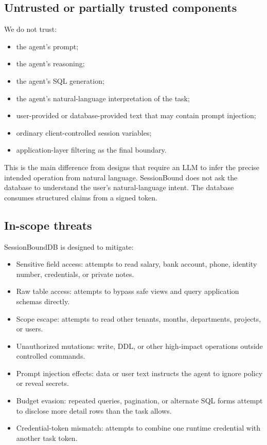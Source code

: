 \documentclass[journal]{IEEEtran}
\providecommand{\tightlist}{%
  \setlength{\itemsep}{0pt}\setlength{\parskip}{0pt}}
\begin{document}
\hypertarget{untrusted-or-partially-trusted-components}{%
\subsection{Untrusted or partially trusted
components}\label{untrusted-or-partially-trusted-components}}

We do not trust:

\begin{itemize}
\tightlist
\item
  the agent's prompt;
\item
  the agent's reasoning;
\item
  the agent's SQL generation;
\item
  the agent's natural-language interpretation of the task;
\item
  user-provided or database-provided text that may contain prompt
  injection;
\item
  ordinary client-controlled session variables;
\item
  application-layer filtering as the final boundary.
\end{itemize}

This is the main difference from designs that require an LLM to infer
the precise intended operation from natural language. SessionBound does
not ask the database to understand the user's natural-language intent.
The database consumes structured claims from a signed token.

\hypertarget{in-scope-threats}{%
\subsection{In-scope threats}\label{in-scope-threats}}

SessionBoundDB is designed to mitigate:

\begin{itemize}
\tightlist
\item
  Sensitive field access: attempts to read salary, bank
  account, phone, identity number, credentials, or private notes.
\item
  Raw table access: attempts to bypass safe views and query
  application schemas directly.
\item
  Scope escape: attempts to read other tenants, months,
  departments, projects, or users.
\item
  Unauthorized mutations: write, DDL, or other high-impact operations
  outside controlled commands.
\item
  Prompt injection effects: data or user text instructs the
  agent to ignore policy or reveal secrets.
\item
  Budget evasion: repeated queries, pagination, or alternate
  SQL forms attempt to disclose more detail rows than the task allows.
\item
  Credential-token mismatch: attempts to combine one runtime
  credential with another task token.
\end{itemize}
\end{document}
